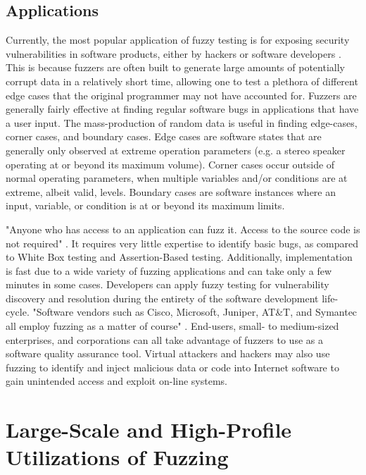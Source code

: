 \documentclass[10pt, final, journal, letterpaper, twoside, twocolumn]{IEEEtran}
\begin{document}
	\subsection{Applications}
		Currently, the most popular application of fuzzy testing is for exposing security vulnerabilities in software products, either by hackers or software developers \cite{microsoft-penetration}. This is because fuzzers are often built to generate large amounts of potentially corrupt data in a relatively short time, allowing one to test a plethora of different edge cases that the original programmer may not have accounted for. Fuzzers are generally fairly effective at finding regular software bugs in applications that have a user input. The mass-production of random data is useful in finding edge-cases, corner cases, and boundary cases. Edge cases are software states that are generally only observed at extreme operation parameters (e.g. a stereo speaker operating at or beyond its maximum volume). Corner cases occur outside of normal operating parameters, when multiple variables and/or conditions are at extreme, albeit valid, levels. Boundary cases are software instances where an input, variable, or condition is at or beyond its maximum limits.
		
		"Anyone who has access to an application can fuzz it. Access to the source code is not required" \cite{clarke}. It requires very little expertise to identify basic bugs, as compared to White Box testing and Assertion-Based testing. Additionally, implementation is fast due to a wide variety of fuzzing applications and can take only a few minutes in some cases. Developers can apply fuzzy testing for vulnerability discovery and resolution during the entirety of the software development life-cycle. "Software vendors such as Cisco, Microsoft, Juniper, AT\&T, and Symantec all employ fuzzing as a matter of course" \cite{clarke}. End-users, small- to medium-sized enterprises, and corporations can all take advantage of fuzzers to use as a software quality assurance tool. Virtual attackers and hackers may also use fuzzing to identify and inject malicious data or code into Internet software to gain unintended access and exploit on-line systems. 
	
	
\section{\label{sec:industry}Large-Scale and High-Profile Utilizations of Fuzzing}
\end{document}
